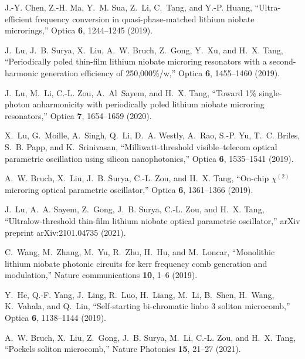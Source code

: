 \documentclass{WileyMSP-template}
\begin{document}
\begin{thebibliography}{10}
\newcommand{\enquote}[1]{``#1''}

J.-Y. Chen, Z.-H. Ma, Y.~M. Sua, Z.~Li, C.~Tang, and Y.-P. Huang,
  \enquote{Ultra-efficient frequency conversion in quasi-phase-matched lithium
  niobate microrings,} {{Optica}} \textbf{6}, 1244--1245
  (2019).

J.~Lu, J.~B. Surya, X.~Liu, A.~W. Bruch, Z.~Gong, Y.~Xu, and H.~X. Tang,
  \enquote{Periodically poled thin-film lithium niobate microring resonators
  with a second-harmonic generation efficiency of 250,000\%/w,}
  {{Optica}} \textbf{6}, 1455--1460 (2019).

J.~Lu, M.~Li, C.-L. Zou, A.~Al~Sayem, and H.~X. Tang, \enquote{Toward 1\%
  single-photon anharmonicity with periodically poled lithium niobate microring
  resonators,} {{Optica}} \textbf{7}, 1654--1659 (2020).

X.~Lu, G.~Moille, A.~Singh, Q.~Li, D.~A. Westly, A.~Rao, S.-P. Yu, T.~C.
  Briles, S.~B. Papp, and K.~Srinivasan, \enquote{Milliwatt-threshold
  visible--telecom optical parametric oscillation using silicon nanophotonics,}
  {{Optica}} \textbf{6}, 1535--1541 (2019).

A.~W. Bruch, X.~Liu, J.~B. Surya, C.-L. Zou, and H.~X. Tang, \enquote{On-chip
  $\chi^{(2)}$ microring optical parametric oscillator,}
  {{Optica}} \textbf{6}, 1361--1366 (2019).

J.~Lu, A.~A. Sayem, Z.~Gong, J.~B. Surya, C.-L. Zou, and H.~X. Tang,
  \enquote{Ultralow-threshold thin-film lithium niobate optical parametric
  oscillator,} {{arXiv preprint arXiv:2101.04735}}
  (2021).

C.~Wang, M.~Zhang, M.~Yu, R.~Zhu, H.~Hu, and M.~Loncar, \enquote{Monolithic
  lithium niobate photonic circuits for kerr frequency comb generation and
  modulation,} {{Nature communications}} \textbf{10}, 1--6
  (2019).

Y.~He, Q.-F. Yang, J.~Ling, R.~Luo, H.~Liang, M.~Li, B.~Shen, H.~Wang,
  K.~Vahala, and Q.~Lin, \enquote{Self-starting bi-chromatic linbo 3 soliton
  microcomb,} {{Optica}} \textbf{6}, 1138--1144 (2019).

A.~W. Bruch, X.~Liu, Z.~Gong, J.~B. Surya, M.~Li, C.-L. Zou, and H.~X. Tang,
  \enquote{Pockels soliton microcomb,} {{Nature
  Photonics}} \textbf{15}, 21--27 (2021).


\end{thebibliography}
\end{document}
